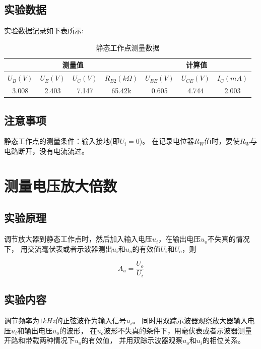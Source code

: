 \documentclass[a4paper]{article}
\begin{document}
    \subsection{实验数据}\label{subsec:3}
    {{实验数据记录如下表所示:}}

    \begin{table}[htbp]
        \centering
        \caption{静态工作点测量数据}
        \begin{tabular}{|c|c|c|c|c|c|c|}
            \hline
            \multicolumn{4}{|c|}{测量值} & \multicolumn{3}{|c|}{计算值} \\
            \hline
            $U_B(V)$ & $U_E(V)$ & $U_C(V)$ & $R_{B2}(k\Omega)$ & $U_{BE}(V)$ & $U_{CE}(V)$ & $I_C(mA)$ \\
            \hline
            3.008    & 2.403    & 7.147    & 65.42k            & 0.605       & 4.744       & 2.003     \\
            \hline
        \end{tabular}\label{tab:table2}
    \end{table}

    \subsection{注意事项}\label{subsec:4}
    {{静态工作点的测量条件：输入接地(即$U_i=0$)。}}
    {{在记录电位器$R_W$值时，要使$R_W$与电路断开，没有电流流过。}}
    \vspace{1cm}


    \section{测量电压放大倍数}\label{sec:4}

    \subsection{实验原理}\label{subsec:5}
    {{调节放大器到静态工作点时，然后加入输入电压$u_i$，在输出电压$u_o$不失真的情况下，
    用交流毫伏表或者示波器测出$u_i$和$u_o$的有效值$U_i$和$U_o$，则}}

    \begin{equation}
        A_u=\frac{U_o}{U_i}\label{eq:equation3}
    \end{equation}

    \subsection{实验内容}\label{subsec:6}
    {{调节频率为$1kHz$的正弦波作为输入信号$u_i$。
    同时用双踪示波器观察放大器输入电压$u_i$和输出电压$u_o$的波形，
    在$u_o$波形不失真的条件下，用毫伏表或者示波器测量开路和带载两种情况下$u_o$的有效值，
    并用双踪示波器观察$u_o$和$u_i$的相位关系。}}
\end{document}

